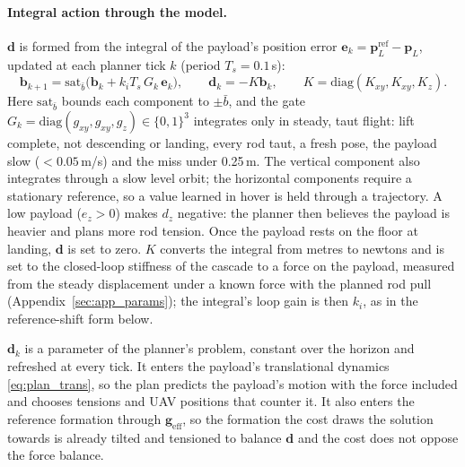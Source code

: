 \paragraph{Integral action through the model.} $\mathbf{d}$ is formed from the integral of the payload's
position error $\mathbf{e}_k = \mathbf{p}_L^{\mathrm{ref}} - \mathbf{p}_L$, updated at each planner tick
$k$ (period $T_s = 0.1$\,s):
\begin{equation}
    \mathbf{b}_{k+1} = \mathrm{sat}_{\bar{b}}\!\big(\mathbf{b}_k + k_i T_s\, G_k\, \mathbf{e}_k\big), \qquad
    \mathbf{d}_k = -K \mathbf{b}_k, \qquad K = \mathrm{diag}(K_{xy}, K_{xy}, K_z).
    \label{eq:lumped_int}
\end{equation}
Here $\mathrm{sat}_{\bar{b}}$ bounds each component to $\pm\bar{b}$, and the gate $G_k = \mathrm{diag}(g_{xy},
g_{xy}, g_z) \in \{0,1\}^3$ integrates only in steady, taut flight: lift complete, not descending or
landing, every rod taut, a fresh pose, the payload slow ($<0.05$\,m/s) and the miss under 0.25\,m. The
vertical component also integrates through a slow level orbit; the horizontal components require a
stationary reference, so a value learned in hover is held through a trajectory. A low payload ($e_z > 0$)
makes $d_z$ negative: the planner then believes the payload is heavier and plans more rod tension. Once
the payload rests on the floor at landing, $\mathbf{d}$ is set to zero. $K$ converts the integral from
metres to newtons and is set to the closed-loop stiffness of the cascade to a force on the payload,
measured from the steady displacement under a known force with the planned rod pull (Appendix~\ref{sec:app_params});
the integral's loop gain is then $k_i$, as in the reference-shift form below.

$\mathbf{d}_k$ is a parameter of the planner's problem, constant over the horizon and refreshed at every
tick. It enters the payload's translational dynamics \eqref{eq:plan_trans}, so the plan predicts the
payload's motion with the force included and chooses tensions and UAV positions that counter it. It also
enters the reference formation through $\mathbf{g}_{\mathrm{eff}}$, so the formation the cost draws the
solution towards is already tilted and tensioned to balance $\mathbf{d}$ and the cost does not oppose the
force balance.

